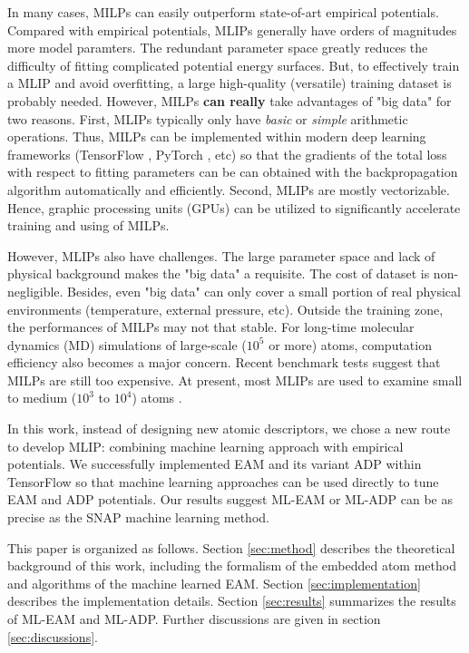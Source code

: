 \documentclass[final,3p,times]{elsarticle}
\begin{document}
In many cases, MILPs can easily outperform state-of-art empirical potentials. 
Compared with empirical potentials, MLIPs generally have orders of magnitudes 
more model paramters. The redundant parameter space greatly reduces the 
difficulty of fitting complicated potential energy surfaces. But, to effectively 
train a MLIP and avoid overfitting, a large high-quality (versatile) training 
dataset is probably needed. However, MILPs \textbf{can really} take advantages 
of "big data" for two reasons. First, MLIPs typically only have 
\textit{basic} or \textit{simple} arithmetic operations. Thus, MILPs can be 
implemented within modern deep learning frameworks 
(TensorFlow \cite{tensorflow}, PyTorch \cite{pytorch}, etc) 
so that the gradients of the total loss with respect to fitting parameters can 
be can obtained with the backpropagation algorithm automatically and 
efficiently. Second, MLIPs are mostly vectorizable. Hence, graphic processing 
units (GPUs) can be utilized to significantly accelerate training and using of 
MILPs.

However, MLIPs also have challenges. The large parameter space and lack of 
physical background makes the "big data" a requisite. The cost of dataset is 
non-negligible. Besides, even "big data" can only cover a small portion of real 
physical environments (temperature, external pressure, etc). Outside the 
training zone, the performances of MILPs may not that stable. For long-time 
molecular dynamics (MD) simulations of large-scale ($10^5$ or more) atoms, 
computation efficiency also becomes a major concern. Recent benchmark 
tests \cite{SnapBenchmark} suggest that MILPs are still too expensive. 
At present, most MLIPs are used to examine small to medium ($10^3$ to $10^4$) 
atoms \cite{SNAP,SFApp0,SFApp1,SFApp2,soap3}.

In this work, instead of designing new atomic descriptors, we chose a new route 
to develop MLIP: combining machine learning approach with empirical potentials. 
We successfully implemented EAM and its variant ADP within TensorFlow so that 
machine learning approaches can be used directly to tune EAM and ADP potentials. 
Our results suggest ML-EAM or ML-ADP can be as precise as the SNAP machine 
learning method. 

This paper is organized as follows. Section \ref{sec:method} describes the 
theoretical background of this work, including the formalism of the embedded 
atom method and algorithms of the machine learned EAM. 
Section \ref{sec:implementation} describes the implementation details.
Section \ref{sec:results} summarizes the results of ML-EAM and ML-ADP. 
Further discussions are given in section \ref{sec:discussions}.
\end{document}
